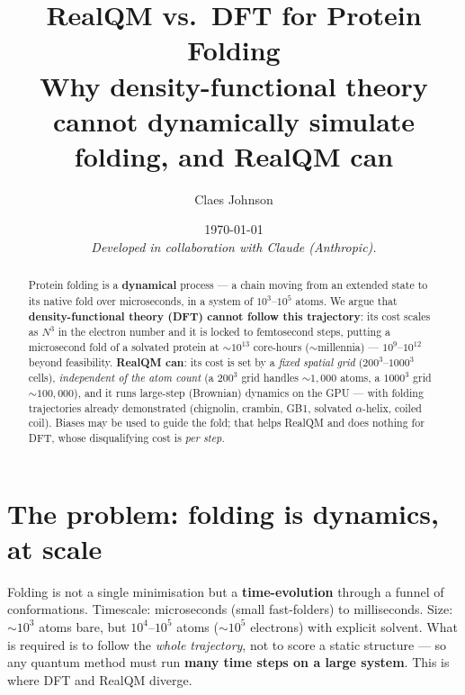 \documentclass[11pt]{article}
\title{\textbf{RealQM vs.\ DFT for Protein Folding}\\[0.3em]
\large Why density-functional theory cannot dynamically simulate folding, and RealQM can}
\author[1]{Claes Johnson}
\affil[1]{KTH Royal Institute of Technology, Stockholm, Sweden \\ \texttt{claesjohnson@gmail.com}}
\date{\today \\[0.4em]
\small\textit{Developed in collaboration with Claude (Anthropic).}}
\begin{document}
\maketitle

\begin{abstract}
Protein folding is a \textbf{dynamical} process --- a chain moving from an extended state to its native fold
over microseconds, in a system of $10^3$--$10^5$ atoms. We argue that \textbf{density-functional theory (DFT)
cannot follow this trajectory}: its cost scales as $N^3$ in the electron number and it is locked to
femtosecond steps, putting a microsecond fold of a solvated protein at ${\sim}10^{13}$ core-hours
(${\sim}$millennia) --- $10^9$--$10^{12}$ beyond feasibility. \textbf{RealQM can}: its cost is set by a
\emph{fixed spatial grid} ($200^3$--$1000^3$ cells), \emph{independent of the atom count} (a $200^3$ grid
handles ${\sim}1{,}000$ atoms, a $1000^3$ grid ${\sim}100{,}000$), and it runs large-step (Brownian) dynamics
on the GPU --- with folding trajectories already demonstrated (chignolin, crambin, GB1, solvated $\alpha$-helix,
coiled coil). Biases may be used to guide the fold; that helps RealQM and does nothing for DFT, whose
disqualifying cost is \emph{per step}.
\end{abstract}

\section{The problem: folding is dynamics, at scale}
Folding is not a single minimisation but a \textbf{time-evolution} through a funnel of conformations.
Timescale: microseconds (small fast-folders) to milliseconds. Size: ${\sim}10^3$ atoms bare, but
$10^4$--$10^5$ atoms (${\sim}10^5$ electrons) with explicit solvent. What is required is to follow the
\emph{whole trajectory}, not to score a static structure --- so any quantum method must run \textbf{many time
steps on a large system}. This is where DFT and RealQM diverge.
\end{document}
